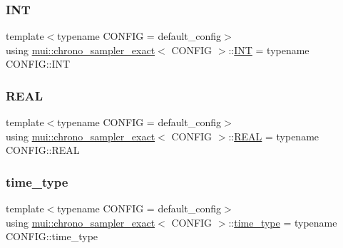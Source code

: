 \subsubsection{\texorpdfstring{I\+NT}{INT}}
{\footnotesize\ttfamily template$<$typename C\+O\+N\+F\+IG  = default\+\_\+config$>$ \\
using \hyperlink{classmui_1_1chrono__sampler__exact}{mui\+::chrono\+\_\+sampler\+\_\+exact}$<$ C\+O\+N\+F\+IG $>$\+::\hyperlink{classmui_1_1chrono__sampler__exact_a1765b8d8fec705157ac526e186727e9a}{I\+NT} =  typename C\+O\+N\+F\+I\+G\+::\+I\+NT}

\mbox{\label{classmui_1_1chrono__sampler__exact_ad55f9693aa8d6a9652d9b51639463d84}} 
\subsubsection{\texorpdfstring{R\+E\+AL}{REAL}}
{\footnotesize\ttfamily template$<$typename C\+O\+N\+F\+IG  = default\+\_\+config$>$ \\
using \hyperlink{classmui_1_1chrono__sampler__exact}{mui\+::chrono\+\_\+sampler\+\_\+exact}$<$ C\+O\+N\+F\+IG $>$\+::\hyperlink{classmui_1_1chrono__sampler__exact_ad55f9693aa8d6a9652d9b51639463d84}{R\+E\+AL} =  typename C\+O\+N\+F\+I\+G\+::\+R\+E\+AL}

\mbox{\label{classmui_1_1chrono__sampler__exact_a5f9178b26822fe901f8a1e97ada68d95}} 
\subsubsection{\texorpdfstring{time\+\_\+type}{time\_type}}
{\footnotesize\ttfamily template$<$typename C\+O\+N\+F\+IG  = default\+\_\+config$>$ \\
using \hyperlink{classmui_1_1chrono__sampler__exact}{mui\+::chrono\+\_\+sampler\+\_\+exact}$<$ C\+O\+N\+F\+IG $>$\+::\hyperlink{classmui_1_1chrono__sampler__exact_a5f9178b26822fe901f8a1e97ada68d95}{time\+\_\+type} =  typename C\+O\+N\+F\+I\+G\+::time\+\_\+type}



